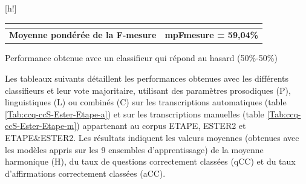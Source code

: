 \documentclass{style/these}
\makeatletter
\renewcommand\familydefault{ptm}
\newenvironment{aTable}%
  {%
   \renewcommand{\familydefault}{lmtt}\selectfont
  \@float{table}}
  {\end@float}
\makeatother
\begin{document}
\begin{part}
\begin{aTable}[h!]
\begin{tabular}{|p{2.4cm}|p{1.4cm}|p{2.1cm}|p{2.3cm}|p{4cm}|}
\multicolumn{5}{c}{}			   													\\ \hline
\multicolumn{4}{|c|}{\textbf{Moyenne pondérée de la F-mesure}}			& \textbf{\color{purple}mpFmesure = 59,04\%}			\\ \hline
\end{tabular}
\caption{Performance obtenue avec un classifieur qui répond au hasard (50\%-50\%)} 
\label{Tab:Fmeasure-Random}
\end{aTable}


Les tableaux suivants détaillent les performances obtenues avec les différents classifieurs et leur vote majoritaire, utilisant des paramètres prosodiques (P), linguistiques (L) ou combinés (C) sur les transcriptions automatiques (table \ref{Tab:ccq-ccS-Ester-Etape-a}) et sur les transcriptions manuelles (table \ref{Tab:ccq-ccS-Ester-Etape-m}) appartenant au corpus ETAPE, ESTER2 et ETAPE\&ESTER2. 
Les résultats indiquent les valeurs moyennes (obtenues avec les modèles appris sur les 9 ensembles d'apprentissage) de la moyenne harmonique (H), du taux de questions correctement classées (qCC) et du taux d'affirmations correctement classées (aCC). 


\end{part}
\end{document}
